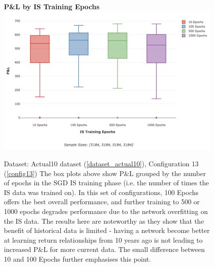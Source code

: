 \documentclass[a4paper,11pt,oneside]{article}
\theoremstyle{plain}
\theoremstyle{definition}
\begin{document}
\begin{figure}[H]
	\centering 
	\textbf{P\&L by IS Training Epochs}
	\includegraphics[scale=0.4]{images/results/data/max_epochs.png}
	\caption[P\&L by IS Training Epochs]{
		Dataset: Actual10 dataset (\ref{dataset_actual10}), Configuration 13 (\ref{config13}) 
		\newline The box plots above show P\&L grouped by the number of epochs in the SGD IS training phase (i.e. the number of times the IS data was trained on). In this set of configurations, 100 Epochs offers the best overall performance, and further training to 500 or 1000 epochs degrades performance due to the network overfitting on the IS data. The results here are noteworthy as they show that the benefit of historical data is limited - having a network become better at learning return relationships from 10 years ago is not leading to increased P\&L for more current data. The small difference between 10 and 100 Epochs further emphasises this point.
	}
	\label{figure-results_pl_max_epochs}
\end{figure}
\end{document}
